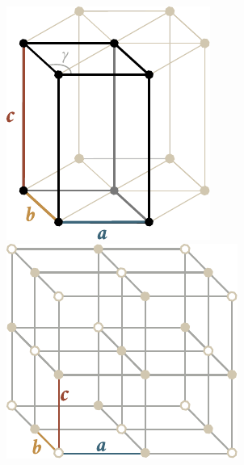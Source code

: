 \begin{figure}[!htb]
	\begin{minipage}[t]{0.5\linewidth}
		\begin{center}
			\includegraphics[scale=1.0]{figures/ch_13/fig_13_4.pdf}
			\caption[]{}
			\label{fig:13_4}
		\end{center}
	\end{minipage}
	\hspace{-0.05cm}
	\begin{minipage}[t]{0.5\linewidth}
		\begin{center}
			\includegraphics[scale=1.0]{figures/ch_13/fig_13_5.pdf}
			\caption[]{}
			\label{fig:13_5}
		\end{center}
	\end{minipage}
	\vspace{-0.4cm}
\end{figure}


